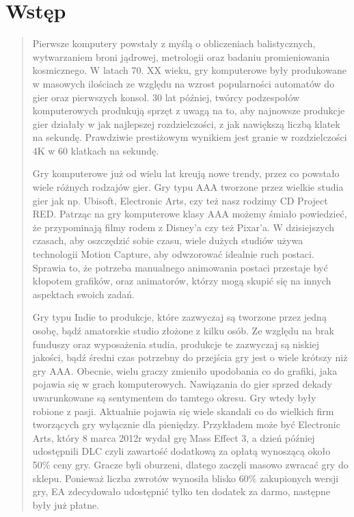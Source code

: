 \chapter{Wstęp}
\begin{quotation}
\indent Pierwsze komputery powstały z myślą o obliczeniach balistycznych, wytwarzaniem broni jądrowej, metrologii oraz badaniu promieniowania kosmicznego. W latach 70. XX wieku, gry komputerowe były produkowane w masowych ilościach ze względu na wzrost popularności automatów do gier oraz pierwszych konsol. 30 lat później, twórcy podzespołów komputerowych produkują sprzęt z uwagą na to, aby najnowsze produkcje gier działały w jak najlepszej rozdzielczości, z jak nawiększą liczbą klatek na sekundę. Prawdziwie prestiżowym wynikiem jest granie w rozdzielczości 4K w 60 klatkach na sekundę.

\indent Gry komputerowe już od wielu lat kreują nowe trendy, przez co powstało wiele różnych rodzajów gier. Gry typu AAA tworzone przez wielkie studia gier jak np. Ubisoft, Electronic Arts, czy też nasz rodzimy CD Project RED. Patrząc na gry komputerowe klasy AAA możemy śmiało powiedzieć, że przypominają filmy rodem z Disney'a czy też Pixar'a. W dzisiejszych czasach, aby oszczędzić sobie czasu, wiele dużych studiów używa technologii Motion Capture, aby odwzorować idealnie ruch postaci. Sprawia to, że potrzeba manualnego animowania postaci przestaje być kłopotem grafików, oraz animatorów, którzy mogą skupić się na innych aspektach swoich zadań.

\indent Gry typu Indie to produkcje, które zazwyczaj są tworzone przez jedną osobę, bądź amatorskie studio złożone z kilku osób. Ze względu na brak funduszy oraz wyposażenia studia, produkcje te zazwyczaj są niskiej jakości, bądź średni czas potrzebny do przejścia gry jest o wiele krótszy niż gry AAA. Obecnie, wielu graczy zmieniło upodobania co do grafiki, jaka pojawia się w grach komputerowych. Nawiązania do gier sprzed dekady uwarunkowane są sentymentem do tamtego okresu. Gry wtedy były robione z pasji. Aktualnie pojawia się wiele skandali co do wielkich firm tworzących gry wyłącznie dla pieniędzy. Przykładem może być Electronic Arts, który 8 marca 2012r wydał grę Mass Effect 3, a dzień później udostępnili DLC czyli zawartość dodatkową za opłatą wynoszącą około 50\% ceny gry. Gracze byli oburzeni, dlatego zaczęli masowo zwracać gry do sklepu. Ponieważ liczba zwrotów wynosiła blisko 60\% zakupionych wersji gry, EA zdecydowało udostępnić tylko ten dodatek za darmo, następne były już płatne.


\end{quotation}
